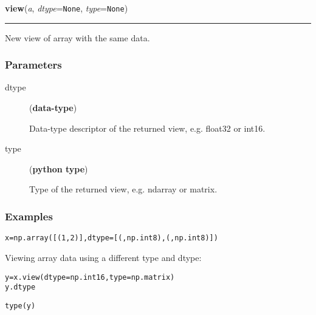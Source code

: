     \begin{boxedminipage}{\textwidth}

    \raggedright \textbf{view}(\textit{a}, \textit{dtype}=\texttt{None}, \textit{type}=\texttt{None})

    \vspace{-1.5ex}

    \rule{\textwidth}{0.5\fboxrule}

New view of array with the same data.



\hypertarget{parameters}{}
\subsubsection*{Parameters}
\begin{description}
\item[{dtype}] (\textbf{data-type})

Data-type descriptor of the returned view, e.g. float32 or int16.

\item[{type}] (\textbf{python type})

Type of the returned view, e.g. ndarray or matrix.

\end{description}



\hypertarget{examples}{}
\subsubsection*{Examples}
\begin{alltt}
\pysrcprompt{{\textgreater}{\textgreater}{\textgreater} }x = np.array([(1, 2)], dtype=[(, np.int8), (, np.int8)])\end{alltt}

Viewing array data using a different type and dtype:
\begin{alltt}
\pysrcprompt{{\textgreater}{\textgreater}{\textgreater} }y = x.view(dtype=np.int16, type=np.matrix)
\pysrcprompt{{\textgreater}{\textgreater}{\textgreater} } y.dtype
\end{alltt}
\begin{alltt}
\pysrcprompt{{\textgreater}{\textgreater}{\textgreater} } type(y)
\end{alltt}


\end{boxedminipage}
